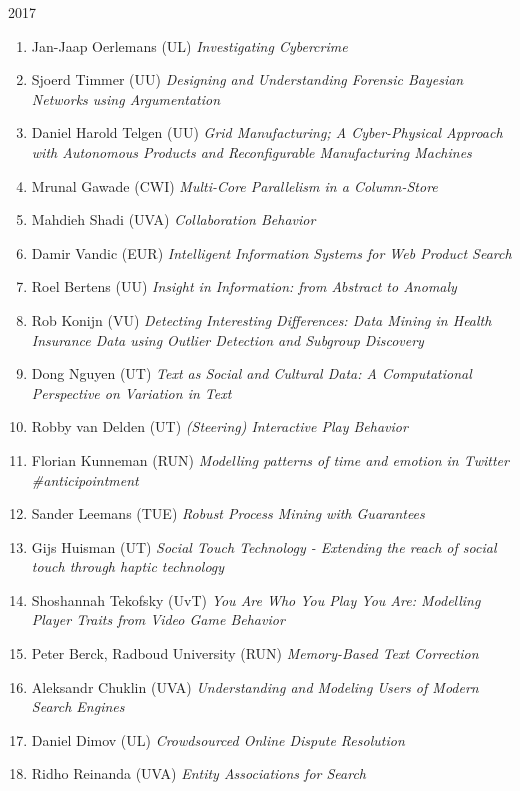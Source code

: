 \begin{multicols}{2}
\begin{scriptsize}
2017
\vspace{0.2cm}
\begin{enumerate}[leftmargin=*,noitemsep,topsep=0pt,parsep=1pt,partopsep=0pt]
\renewcommand{\labelenumi}{2017-\arabic{enumi}}
\item Jan-Jaap Oerlemans (UL) \textit{Investigating Cybercrime
}\item Sjoerd Timmer (UU) \textit{Designing and Understanding Forensic Bayesian Networks using Argumentation
}\item Daniel Harold Telgen (UU) \textit{Grid Manufacturing; A Cyber-Physical Approach with Autonomous Products and Reconfigurable Manufacturing Machines
}\item Mrunal Gawade (CWI) \textit{Multi-Core Parallelism in a Column-Store
}\item Mahdieh Shadi (UVA) \textit{Collaboration Behavior 
}\item Damir Vandic (EUR) \textit{Intelligent Information Systems for Web Product Search
}\item Roel Bertens (UU) \textit{Insight in Information: from Abstract to Anomaly
}\item Rob Konijn (VU) \textit{Detecting Interesting Differences: Data Mining in Health Insurance Data using Outlier Detection and Subgroup Discovery}
\item Dong Nguyen (UT) \textit{Text as Social and Cultural Data: A Computational Perspective on Variation in Text
}\item Robby van Delden (UT) \textit{(Steering) Interactive Play Behavior
}\item Florian Kunneman (RUN) \textit{Modelling patterns of time and emotion in Twitter \#anticipointment
}\item Sander Leemans (TUE) \textit{Robust Process Mining with Guarantees
}\item Gijs Huisman (UT) \textit{Social Touch Technology - Extending the reach of social touch through haptic technology
}\item Shoshannah Tekofsky (UvT) \textit{You Are Who You Play You Are: Modelling Player Traits from Video Game Behavior
}\item Peter Berck, Radboud University (RUN) \textit{Memory-Based Text Correction
}\item Aleksandr Chuklin (UVA) \textit{Understanding and Modeling Users of Modern Search Engines
}\item Daniel Dimov (UL) \textit{Crowdsourced Online Dispute Resolution
}\item Ridho Reinanda (UVA) \textit{Entity Associations for Search
}
\end{enumerate}
\end{scriptsize}
\end{multicols}
